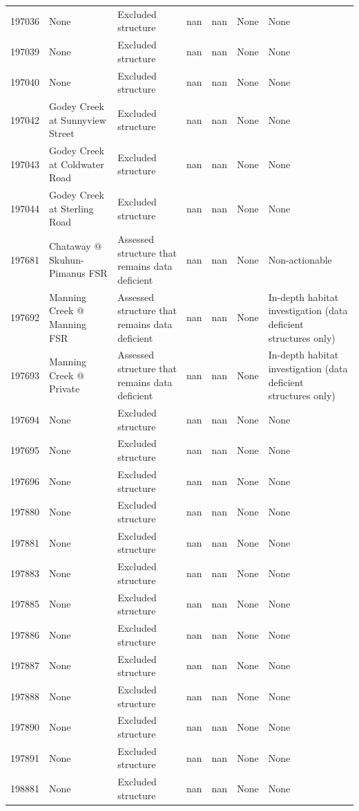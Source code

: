 \documentclass[
  letterpaper,
  DIV=11,
  numbers=noendperiod]{scrreprt}
\begin{document}
\begin{longtable}[]{@{}lllllll@{}}
197036 & None & Excluded structure & nan & nan & None & None \\
197039 & None & Excluded structure & nan & nan & None & None \\
197040 & None & Excluded structure & nan & nan & None & None \\
197042 & Godey Creek at Sunnyview Street & Excluded structure & nan &
nan & None & None \\
197043 & Godey Creek at Coldwater Road & Excluded structure & nan & nan
& None & None \\
197044 & Godey Creek at Sterling Road & Excluded structure & nan & nan &
None & None \\
197681 & Chataway @ Skuhun-Pimanus FSR & Assessed structure that remains
data deficient & nan & nan & None & Non-actionable \\
197692 & Manning Creek @ Manning FSR & Assessed structure that remains
data deficient & nan & nan & None & In-depth habitat investigation (data
deficient structures only) \\
197693 & Manning Creek @ Private & Assessed structure that remains data
deficient & nan & nan & None & In-depth habitat investigation (data
deficient structures only) \\
197694 & None & Excluded structure & nan & nan & None & None \\
197695 & None & Excluded structure & nan & nan & None & None \\
197696 & None & Excluded structure & nan & nan & None & None \\
197880 & None & Excluded structure & nan & nan & None & None \\
197881 & None & Excluded structure & nan & nan & None & None \\
197883 & None & Excluded structure & nan & nan & None & None \\
197885 & None & Excluded structure & nan & nan & None & None \\
197886 & None & Excluded structure & nan & nan & None & None \\
197887 & None & Excluded structure & nan & nan & None & None \\
197888 & None & Excluded structure & nan & nan & None & None \\
197890 & None & Excluded structure & nan & nan & None & None \\
197891 & None & Excluded structure & nan & nan & None & None \\
198881 & None & Excluded structure & nan & nan & None & None \\

\end{longtable}
\end{document}
